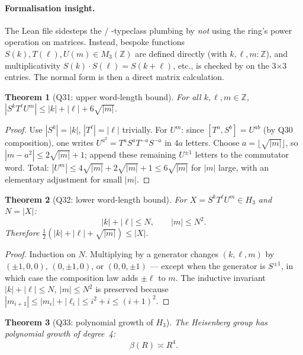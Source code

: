 \documentclass[11pt,a4paper]{article}
\newcommand{\Z}{\mathbb{Z}}
\theoremstyle{plain}
\newtheorem{theorem}{Theorem}[section]
\theoremstyle{definition}
\begin{document}
\paragraph{Formalisation insight.}
The Lean file sidesteps the  / -typeclass
plumbing by \emph{not} using the ring's power operation on matrices.
Instead, bespoke functions $S(k), T(\ell), U(m) \in M_3(\Z)$ are
defined directly (with $k, \ell, m : \Z$), and multiplicativity
$S(k) \cdot S(\ell) = S(k + \ell)$, etc., is checked by
 on the 3$\times$3 entries. The normal form is then a
direct matrix calculation.

\begin{theorem}[Q31: upper word-length bound]
For all $k, \ell, m \in \Z$,
$|S^k T^\ell U^m| \leq |k| + |\ell| + 6\sqrt{|m|}$.
\end{theorem}

\begin{proof}
Use $|S^k| = |k|$, $|T^\ell| = |\ell|$ trivially.
For $U^m$: since $[T^a, S^b] = U^{ab}$ (by Q30 composition), one
writes $U^{a^2} = T^a S^a T^{-a} S^{-a}$ in $4a$ letters. Choose
$a = \lfloor\sqrt{|m|}\rfloor$, so $|m - a^2| \leq 2\sqrt{|m|} + 1$;
append these remaining $U^{\pm 1}$ letters to the commutator word.
Total: $|U^m| \leq 4\sqrt{|m|} + 2\sqrt{|m|} + 1 \leq 6\sqrt{|m|}$ for
$|m|$ large, with an elementary adjustment for small $|m|$.
\end{proof}

\begin{theorem}[Q32: lower word-length bound]
For $X = S^k T^\ell U^m \in H_3$ and $N = |X|$:
\[ |k| + |\ell| \leq N, \qquad |m| \leq N^2. \]
Therefore $\tfrac12(|k| + |\ell| + \sqrt{|m|}) \leq |X|$.
\end{theorem}

\begin{proof}
Induction on $N$. Multiplying by a generator changes $(k, \ell, m)$ by
$(\pm 1, 0, 0)$, $(0, \pm 1, 0)$, or $(0, 0, \pm 1)$ --- except when the
generator is $S^{\pm 1}$, in which case the composition law adds
$\pm \ell$ to $m$. The inductive invariant $|k|+|\ell|\leq N,\ |m|\leq N^2$
is preserved because $|m_{i+1}| \leq |m_i| + |\ell_i| \leq i^2 + i
\leq (i+1)^2$.
\end{proof}

\begin{theorem}[Q33: polynomial growth of $H_3$]
The Heisenberg group has polynomial growth of degree~4:
\[ \beta(R) \asymp R^4. \]
\end{theorem}
\end{document}
